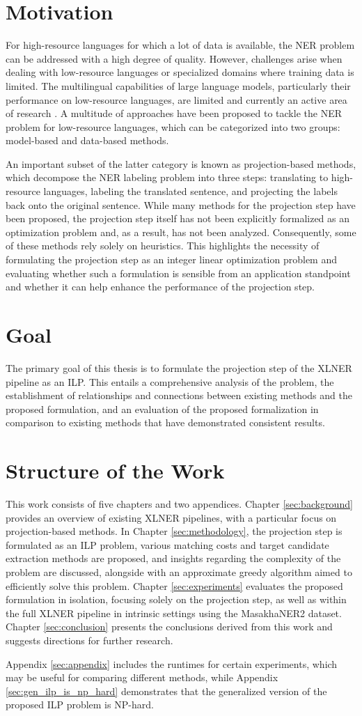 \section{Motivation}
For high-resource languages for which a lot of data is available, the NER problem can be addressed
with a high degree of quality. However, challenges arise when dealing with low-resource languages or
specialized domains where training data is limited. The multilingual capabilities of large language
models, particularly their performance on low-resource languages, are limited and currently
an active area of research \cite{lai-etal-2024-llms}. A multitude of approaches have
been proposed to tackle the NER problem for low-resource languages, which can be categorized
into two groups: model-based and data-based methods.

An important subset of the latter category is known as projection-based methods, which decompose
the NER labeling problem into three steps: translating to high-resource languages, labeling the
translated sentence, and projecting the labels back onto the original sentence. While many methods
for the projection step have been proposed, the projection step itself has not been explicitly formalized
as an optimization problem and, as a result, has not been analyzed. Consequently, some of these
methods rely solely on heuristics. This highlights the necessity of formulating the projection
step as an integer linear optimization problem and evaluating whether such a formulation is
sensible from an application standpoint and whether it can help enhance the performance of the
projection step.

\section{Goal}
The primary goal of this thesis is to formulate the projection step of the \ac{XLNER} pipeline as
an \ac{ILP}. This entails a comprehensive analysis of the problem, the establishment of relationships
and connections between existing methods and the proposed formulation, and an evaluation
of the proposed formalization in comparison to existing methods that have demonstrated
consistent results.

\section{Structure of the Work}
This work consists of five chapters and two appendices. Chapter \ref{sec:background} provides
an overview of existing XLNER pipelines, with a particular focus on projection-based methods.
In Chapter \ref{sec:methodology}, the projection step is formulated as an ILP problem, various
matching costs and target candidate extraction methods are proposed, and insights regarding the
complexity of the problem are discussed, alongside with an approximate greedy
algorithm aimed to efficiently solve this problem. Chapter \ref{sec:experiments} evaluates
the proposed formulation in isolation, focusing solely on the projection step, as well as
within the full XLNER pipeline in intrinsic settings using the MasakhaNER2 dataset.
Chapter \ref{sec:conclusion} presents the conclusions derived from this work and suggests
directions for further research.

Appendix \ref{sec:appendix} includes the runtimes for certain experiments, which may be useful for
comparing different methods, while Appendix \ref{sec:gen_ilp_is_np_hard} demonstrates that the
generalized version of the proposed ILP problem is NP-hard.
